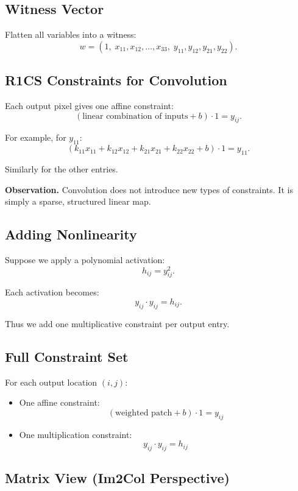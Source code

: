 \subsection{Witness Vector}

Flatten all variables into a witness:
\[
w = (1,\; x_{11},x_{12},\ldots,x_{33},\; y_{11},y_{12},y_{21},y_{22}).
\]

\subsection{R1CS Constraints for Convolution}

Each output pixel gives one affine constraint:
\[
(\text{linear combination of inputs} + b)\cdot 1 = y_{ij}.
\]

For example, for $y_{11}$:
\[
(k_{11}x_{11} + k_{12}x_{12} + k_{21}x_{21} + k_{22}x_{22} + b)\cdot 1 = y_{11}.
\]

Similarly for the other entries.

\medskip

\noindent
\textbf{Observation.}
Convolution does not introduce new types of constraints.  
It is simply a sparse, structured linear map.

\subsection{Adding Nonlinearity}

Suppose we apply a polynomial activation:
\[
h_{ij} = y_{ij}^2.
\]

Each activation becomes:
\[
y_{ij} \cdot y_{ij} = h_{ij}.
\]

Thus we add one multiplicative constraint per output entry.

\subsection{Full Constraint Set}

For each output location $(i,j)$:
\begin{itemize}
\item One affine constraint:
\[
(\text{weighted patch} + b)\cdot 1 = y_{ij}
\]
\item One multiplication constraint:
\[
y_{ij} \cdot y_{ij} = h_{ij}
\]
\end{itemize}

\subsection{Matrix View (Im2Col Perspective)}

